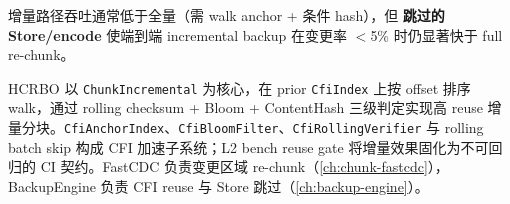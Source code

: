 增量路径吞吐通常低于全量（需 walk anchor + 条件 hash），但 \textbf{跳过的 Store/encode} 使端到端 incremental backup 在变更率 $<$5\% 时仍显著快于 full re-chunk。


HCRBO 以 \texttt{ChunkIncremental} 为核心，在 prior \texttt{CfiIndex} 上按 offset 排序 walk，通过 rolling checksum + Bloom + ContentHash 三级判定实现高 reuse 增量分块。\texttt{CfiAnchorIndex}、\texttt{CfiBloomFilter}、\texttt{CfiRollingVerifier} 与 rolling batch skip 构成 CFI 加速子系统；L2 bench reuse gate 将增量效果固化为不可回归的 CI 契约。FastCDC 负责变更区域 re-chunk（\cref{ch:chunk-fastcdc}），BackupEngine 负责 CFI reuse 与 Store 跳过（\cref{ch:backup-engine}）。
